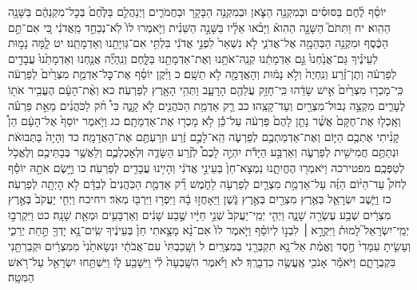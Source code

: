 \documentclass[twoside, openany, parskip=half, 11pt]{book}
\begin{document}
יוֹסֵ֨ף לֶ֜חֶם בַּסּוּסִ֗ים וּבְמִקְנֵ֥ה הַצֹּ֛אן וּבְמִקְנֵ֥ה הַבָּקָ֖ר וּבַחֲמֹרִ֑ים וַיְנַהֲלֵ֤ם בַּלֶּ֙חֶם֙ בְּכׇל־מִקְנֵהֶ֔ם בַּשָּׁנָ֖ה הַהִֽוא׃ יח וַתִּתֹּם֮ הַשָּׁנָ֣ה הַהִוא֒ וַיָּבֹ֨אוּ אֵלָ֜יו בַּשָּׁנָ֣ה הַשֵּׁנִ֗ית וַיֹּ֤אמְרוּ לוֹ֙ לֹֽא־נְכַחֵ֣ד מֵֽאֲדֹנִ֔י כִּ֚י אִם־תַּ֣ם הַכֶּ֔סֶף וּמִקְנֵ֥ה הַבְּהֵמָ֖ה אֶל־אֲדֹנִ֑י לֹ֤א נִשְׁאַר֙ לִפְנֵ֣י אֲדֹנִ֔י בִּלְתִּ֥י אִם־גְּוִיָּתֵ֖נוּ וְאַדְמָתֵֽנוּ׃ יט לָ֧מָּה נָמ֣וּת לְעֵינֶ֗יךָ גַּם־אֲנַ֙חְנוּ֙ גַּ֣ם אַדְמָתֵ֔נוּ קְנֵֽה־אֹתָ֥נוּ וְאֶת־אַדְמָתֵ֖נוּ בַּלָּ֑חֶם וְנִֽהְיֶ֞ה אֲנַ֤חְנוּ וְאַדְמָתֵ֙נוּ֙ עֲבָדִ֣ים לְפַרְעֹ֔ה וְתֶן־זֶ֗רַע וְנִֽחְיֶה֙ וְלֹ֣א נָמ֔וּת וְהָאֲדָמָ֖ה לֹ֥א תֵשָֽׁם׃ כ וַיִּ֨קֶן יוֹסֵ֜ף אֶת־כׇּל־אַדְמַ֤ת מִצְרַ֙יִם֙ לְפַרְעֹ֔ה כִּֽי־מָכְר֤וּ מִצְרַ֙יִם֙ אִ֣ישׁ שָׂדֵ֔הוּ כִּֽי־חָזַ֥ק עֲלֵהֶ֖ם הָרָעָ֑ב וַתְּהִ֥י הָאָ֖רֶץ לְפַרְעֹֽה׃ כא וְאֶ֨ת־הָעָ֔ם הֶעֱבִ֥יר אֹת֖וֹ לֶעָרִ֑ים מִקְצֵ֥ה גְבוּל־מִצְרַ֖יִם וְעַד־קָצֵֽהוּ׃ כב רַ֛ק אַדְמַ֥ת הַכֹּהֲנִ֖ים לֹ֣א קָנָ֑ה כִּי֩ חֹ֨ק לַכֹּהֲנִ֜ים מֵאֵ֣ת פַּרְעֹ֗ה וְאָֽכְל֤וּ אֶת־חֻקָּם֙ אֲשֶׁ֨ר נָתַ֤ן לָהֶם֙ פַּרְעֹ֔ה עַל־כֵּ֕ן לֹ֥א מָכְר֖וּ אֶת־אַדְמָתָֽם׃ כג וַיֹּ֤אמֶר יוֹסֵף֙ אֶל־הָעָ֔ם הֵן֩ קָנִ֨יתִי אֶתְכֶ֥ם הַיּ֛וֹם וְאֶת־אַדְמַתְכֶ֖ם לְפַרְעֹ֑ה הֵֽא־לָכֶ֣ם זֶ֔רַע וּזְרַעְתֶּ֖ם אֶת־הָאֲדָמָֽה׃ כד וְהָיָה֙ בַּתְּבוּאֹ֔ת וּנְתַתֶּ֥ם חֲמִישִׁ֖ית לְפַרְעֹ֑ה וְאַרְבַּ֣ע הַיָּדֹ֡ת יִהְיֶ֣ה לָכֶם֩ לְזֶ֨רַע הַשָּׂדֶ֧ה וּֽלְאׇכְלְכֶ֛ם וְלַאֲשֶׁ֥ר בְּבָתֵּיכֶ֖ם וְלֶאֱכֹ֥ל לְטַפְּכֶֽם׃ מפטירכה וַיֹּאמְר֖וּ הֶחֱיִתָ֑נוּ נִמְצָא־חֵן֙ בְּעֵינֵ֣י אֲדֹנִ֔י וְהָיִ֥ינוּ עֲבָדִ֖ים לְפַרְעֹֽה׃ כו וַיָּ֣שֶׂם אֹתָ֣הּ יוֹסֵ֡ף לְחֹק֩ עַד־הַיּ֨וֹם הַזֶּ֜ה עַל־אַדְמַ֥ת מִצְרַ֛יִם לְפַרְעֹ֖ה לַחֹ֑מֶשׁ רַ֞ק אַדְמַ֤ת הַכֹּֽהֲנִים֙ לְבַדָּ֔ם לֹ֥א הָיְתָ֖ה לְפַרְעֹֽה׃ כז וַיֵּ֧שֶׁב יִשְׂרָאֵ֛ל בְּאֶ֥רֶץ מִצְרַ֖יִם בְּאֶ֣רֶץ גֹּ֑שֶׁן וַיֵּאָחֲז֣וּ בָ֔הּ וַיִּפְר֥וּ וַיִּרְבּ֖וּ מְאֹֽד׃ ויחיכח וַיְחִ֤י יַעֲקֹב֙ בְּאֶ֣רֶץ מִצְרַ֔יִם שְׁבַ֥ע עֶשְׂרֵ֖ה שָׁנָ֑ה וַיְהִ֤י יְמֵֽי־יַעֲקֹב֙ שְׁנֵ֣י חַיָּ֔יו שֶׁ֣בַע שָׁנִ֔ים וְאַרְבָּעִ֥ים וּמְאַ֖ת שָׁנָֽה׃ כט וַיִּקְרְב֣וּ יְמֵֽי־יִשְׂרָאֵל֮ לָמוּת֒ וַיִּקְרָ֣א ׀ לִבְנ֣וֹ לְיוֹסֵ֗ף וַיֹּ֤אמֶר לוֹ֙ אִם־נָ֨א מָצָ֤אתִי חֵן֙ בְּעֵינֶ֔יךָ שִֽׂים־נָ֥א יָדְךָ֖ תַּ֣חַת יְרֵכִ֑י וְעָשִׂ֤יתָ עִמָּדִי֙ חֶ֣סֶד וֶאֱמֶ֔ת אַל־נָ֥א תִקְבְּרֵ֖נִי בְּמִצְרָֽיִם׃ ל וְשָֽׁכַבְתִּי֙ עִם־אֲבֹתַ֔י וּנְשָׂאתַ֙נִי֙ מִמִּצְרַ֔יִם וּקְבַרְתַּ֖נִי בִּקְבֻרָתָ֑ם וַיֹּאמַ֕ר אָנֹכִ֖י אֶֽעֱשֶׂ֥ה כִדְבָרֶֽךָ׃ לא וַיֹּ֗אמֶר הִשָּֽׁבְעָה֙ לִ֔י וַיִּשָּׁבַ֖ע ל֑וֹ וַיִּשְׁתַּ֥חוּ יִשְׂרָאֵ֖ל עַל־רֹ֥אשׁ הַמִּטָּֽה׃
\end{document}
